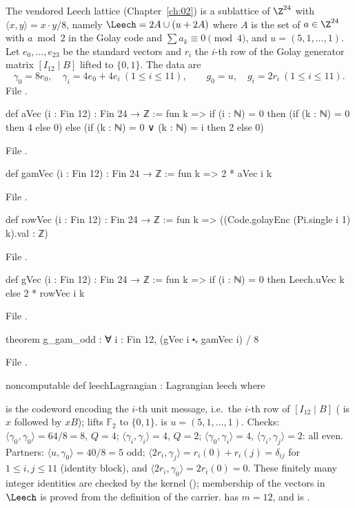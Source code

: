 The vendored Leech lattice (Chapter~\ref{ch:02}) is a sublattice of $\Z^{24}$ with
$\langle x,y\rangle=x\cdot y/8$, namely $\Leech=2A\cup(u+2A)$ where $A$ is the set of $a\in\Z^{24}$
with $a\bmod2$ in the Golay code and $\sum a_k\equiv0\pmod4$, and $u=(5,1,\dots,1)$.  Let
$e_0,\dots,e_{23}$ be the standard vectors and $r_i$ the $i$-th row of the Golay generator matrix
$[I_{12}\mid B]$ lifted to $\{0,1\}$.  The data are
\begin{equation*}
  \gamma_0=8e_0,\quad\gamma_i=4e_0+4e_i\ (1\le i\le11),\qquad g_0=u,\quad g_i=2r_i\ (1\le i\le 11).
\end{equation*}
\noindent File .
\begin{leancode}
def aVec (i : Fin 12) : Fin 24 → ℤ := fun k =>
  if (i : ℕ) = 0 then (if (k : ℕ) = 0 then 4 else 0)
  else (if (k : ℕ) = 0 ∨ (k : ℕ) = i then 2 else 0)
\end{leancode}
\noindent File .
\begin{leancode}
def gamVec (i : Fin 12) : Fin 24 → ℤ := fun k => 2 * aVec i k
\end{leancode}
\noindent File .
\begin{leancode}
def rowVec (i : Fin 12) : Fin 24 → ℤ := fun k => ((Code.golayEnc (Pi.single i 1) k).val : ℤ)
\end{leancode}
\noindent File .
\begin{leancode}
def gVec (i : Fin 12) : Fin 24 → ℤ := fun k =>
  if (i : ℕ) = 0 then Leech.uVec k else 2 * rowVec i k
\end{leancode}
\noindent File .
\begin{leancode}
theorem g_gam_odd : ∀ i : Fin 12, (gVec i ⬝ᵥ gamVec i) / 8 %
\end{leancode}
\noindent File .
\begin{leancode}
noncomputable def leechLagrangian : Lagrangian leech where
\end{leancode}
\begin{dictionary}
 is the codeword encoding the $i$-th unit message, i.e.\ the
$i$-th row of $[I_{12}\mid B]$ ( is $x$ followed by $xB$);  lifts
$\mathbb F_2$ to $\{0,1\}$.   is $u=(5,1,\dots,1)$.  Checks: $\langle\gamma_0,
\gamma_0\rangle=64/8=8$, $Q=4$; $\langle\gamma_i,\gamma_i\rangle=4$, $Q=2$; $\langle\gamma_0,
\gamma_i\rangle=4$, $\langle\gamma_i,\gamma_j\rangle=2$: all even.  Partners:
$\langle u,\gamma_0\rangle=40/8=5$ odd; $\langle2r_i,\gamma_j\rangle=r_i(0)+r_i(j)=\delta_{ij}$
for $1\le i,j\le11$ (identity block), and $\langle2r_i,\gamma_0\rangle=2r_i(0)=0$.  These finitely
many integer identities are checked by the kernel (); membership of the vectors
in $\Leech$ is proved from the definition of the carrier.   has $m=12$, and
 is .
\end{dictionary}

